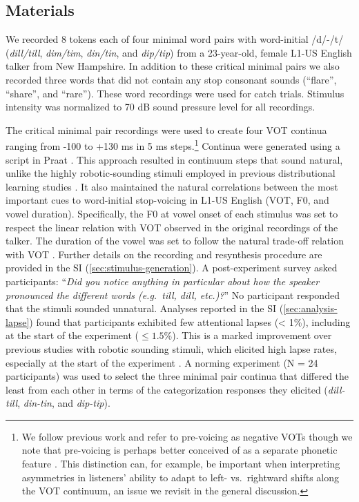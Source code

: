 \documentclass[
  11pt,
  man,mask,floatsintext]{apa6}
\begin{document}
\subsection{Materials}\label{materials}

We recorded 8 tokens each of four minimal word pairs with word-initial /d/-/t/ (\emph{dill/till}, \emph{dim/tim}, \emph{din/tin}, and \emph{dip/tip}) from a 23-year-old, female L1-US English talker from New Hampshire. In addition to these critical minimal pairs we also recorded three words that did not contain any stop consonant sounds (``flare'', ``share'', and ``rare''). These word recordings were used for catch trials. Stimulus intensity was normalized to 70 dB sound pressure level for all recordings.

The critical minimal pair recordings were used to create four VOT continua ranging from -100 to +130 ms in 5 ms steps.\footnote{We follow previous work \autocite{kleinschmidt2020,lisker-abramson1964} and refer to pre-voicing as negative VOTs though we note that pre-voicing is perhaps better conceived of as a separate phonetic feature \autocite[for discussion, see][]{mikuteit-reetz2007}. This distinction can, for example, be important when interpreting asymmetries in listeners' ability to adapt to left- vs.~rightward shifts along the VOT continuum, an issue we revisit in the general discussion.} Continua were generated using a script \autocite{winn2020} in Praat \autocite{boersma2022}. This approach resulted in continuum steps that sound natural, unlike the highly robotic-sounding stimuli employed in previous distributional learning studies \autocite[but see][]{theodore-monto2019}. It also maintained the natural correlations between the most important cues to word-initial stop-voicing in L1-US English (VOT, F0, and vowel duration). Specifically, the F0 at vowel onset of each stimulus was set to respect the linear relation with VOT observed in the original recordings of the talker. The duration of the vowel was set to follow the natural trade-off relation with VOT \autocite{allen-miller1999}. Further details on the recording and resynthesis procedure are provided in the SI (\ref{sec:stimulus-generation}). A post-experiment survey asked participants: ``\emph{Did you notice anything in particular about how the speaker pronounced the different words (e.g.~till, dill, etc.)?}'' No participant responded that the stimuli sounded unnatural. Analyses reported in the SI (\ref{sec:analysis-lapse}) found that participants exhibited few attentional lapses (\textless{} 1\%), including at the start of the experiment (\(\leq 1.5\)\%). This is a marked improvement over previous studies with robotic sounding stimuli, which elicited high lapse rates, especially at the start of the experiment \autocite[12\%,][]{kleinschmidt2020}. A norming experiment (N = 24 participants) was used to select the three minimal pair continua that differed the least from each other in terms of the categorization responses they elicited (\emph{dill-till}, \emph{din-tin}, and \emph{dip-tip}).
\end{document}

